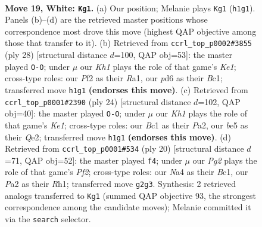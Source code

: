 \documentclass[11pt]{article}
\begin{document}
\clearpage

\begin{figure}[p]\centering
\begin{subfigure}{0.46\textwidth}\centering
\resizebox{\linewidth}{!}{%
\newchessgame
\chessboard[
  setfen={r1br4/ppp2pk1/3p4/4b1pp/N1P1Pn1q/4Q2P/PP3PP1/RBB2R1K w - - 0 19},
  showmover=false,
  pgfstyle=straightmove, color=movearrow, markmove={h1-g1}
]}
\caption{}
\end{subfigure}\hfill
\begin{subfigure}{0.46\textwidth}\centering
\resizebox{\linewidth}{!}{%
\newchessgame
\chessboard[
  setfen={r1b1k2r/1pbp1ppp/2n2q2/PQ6/1p2P3/1N1B4/1P3PPP/R1B1K2R w KQkq - 3 15},
  showmover=false,
  pgfstyle=straightmove, color=movearrow, markmove={e1-g1}
]}
\caption{}
\end{subfigure}
\\[4pt]
\begin{subfigure}{0.46\textwidth}\centering
\resizebox{\linewidth}{!}{%
\newchessgame
\chessboard[
  setfen={r3kb1r/1pp2pp1/p2q1n2/3Ppb1p/7B/2N2B1P/PPP1QPP1/R3K2R w KQkq - 0 13},
  showmover=false,
  pgfstyle=straightmove, color=movearrow, markmove={e1-g1}
]}
\caption{}
\end{subfigure}\hfill
\begin{subfigure}{0.46\textwidth}\centering
\resizebox{\linewidth}{!}{%
\newchessgame
\chessboard[
  setfen={r1b1k2r/pp1p1ppp/4p3/q3P3/1nPbQ3/2N5/PP3PPP/R1B1KB1R w KQkq - 0 11},
  showmover=false,
  pgfstyle=straightmove, color=movearrow, markmove={f2-f4}
]}
\caption{}
\end{subfigure}
\caption{\textbf{Move 19, White: \texttt{Kg1}.} (a) Our position; Melanie plays \texttt{Kg1} (\texttt{h1g1}). Panels (b)--(d) are the retrieved master positions whose correspondence most drove this move (highest QAP objective among those that transfer to it). (b) Retrieved from \texttt{ccrl\_top\_p0002\#3855} (ply 28) [structural distance $d$=100, QAP obj=53]: the master played \texttt{O-O}; under $\mu$ our \emph{Kh1} plays the role of that game's \emph{Ke1}; cross-type roles: our \emph{P}f2 as their \emph{R}a1, our \emph{p}d6 as their \emph{B}c1; transferred move \texttt{h1g1} \textbf{(endorses this move)}. (c) Retrieved from \texttt{ccrl\_top\_p0001\#2390} (ply 24) [structural distance $d$=102, QAP obj=40]: the master played \texttt{O-O}; under $\mu$ our \emph{Kh1} plays the role of that game's \emph{Ke1}; cross-type roles: our \emph{B}c1 as their \emph{P}a2, our \emph{b}e5 as their \emph{Q}e2; transferred move \texttt{h1g1} \textbf{(endorses this move)}. (d) Retrieved from \texttt{ccrl\_top\_p0001\#534} (ply 20) [structural distance $d$=71, QAP obj=52]: the master played \texttt{f4}; under $\mu$ our \emph{Pg2} plays the role of that game's \emph{Pf2}; cross-type roles: our \emph{N}a4 as their \emph{B}c1, our \emph{P}a2 as their \emph{R}h1; transferred move \texttt{g2g3}. Synthesis: 2 retrieved analogs transferred to \texttt{Kg1} (summed QAP objective 93, the strongest correspondence among the candidate moves); Melanie committed it via the \texttt{search} selector.}
\label{fig:thought-m36}
\end{figure}
\end{document}
